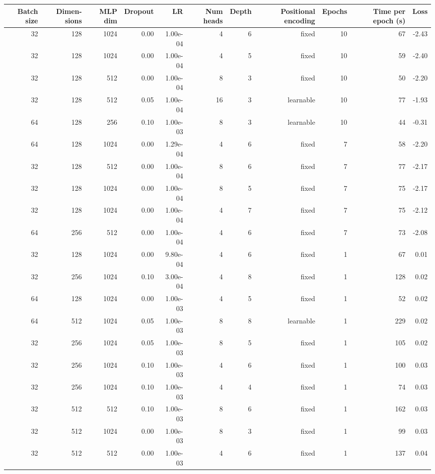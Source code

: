 \begin{appendices}
\begin{table}
\begin{tabular}{rrrrrrrrrrr}
\multicolumn{1}{p{0.5cm}}{\raggedleft Batch size} & 
\multicolumn{1}{p{1.0cm}}{\raggedleft Dimen-sions} & 
\multicolumn{1}{p{0.5cm}}{\raggedleft MLP dim} & 
\multicolumn{1}{p{1.0cm}}{\raggedleft Dropout} & 
\multicolumn{1}{p{0.5cm}}{\raggedleft LR} & 
\multicolumn{1}{p{0.5cm}}{\raggedleft Num heads} & 
\multicolumn{1}{p{0.5cm}}{\raggedleft Depth} & 
\multicolumn{1}{p{1.5cm}}{\raggedleft Positional encoding} & 
\multicolumn{1}{p{1.0cm}}{\raggedleft Epochs} &
\multicolumn{1}{p{1.5cm}}{\raggedleft Time per epoch (s)} & 
\multicolumn{1}{p{0.5cm}}{\raggedleft Loss} \\

\midrule
32 & 128 & 1024 & 0.00 & 1.00e-04 & 4 & 6 & fixed & 10 & 67 & -2.43 \\
32 & 128 & 1024 & 0.00 & 1.00e-04 & 4 & 5 & fixed & 10 & 59 & -2.40 \\
32 & 128 & 512 & 0.00 & 1.00e-04 & 8 & 3 & fixed & 10 & 50 & -2.20 \\
32 & 128 & 512 & 0.05 & 1.00e-04 & 16 & 3 & learnable & 10 & 77 & -1.93 \\
64 & 128 & 256 & 0.10 & 1.00e-03 & 8 & 3 & learnable & 10 & 44 & -0.31 \\
64 & 128 & 1024 & 0.00 & 1.29e-04 & 4 & 6 & fixed & 7 & 58 & -2.20 \\
32 & 128 & 512 & 0.00 & 1.00e-04 & 8 & 6 & fixed & 7 & 77 & -2.17 \\
32 & 128 & 1024 & 0.00 & 1.00e-04 & 8 & 5 & fixed & 7 & 75 & -2.17 \\
32 & 128 & 1024 & 0.00 & 1.00e-04 & 4 & 7 & fixed & 7 & 75 & -2.12 \\
64 & 256 & 512 & 0.00 & 1.00e-04 & 4 & 6 & fixed & 7 & 73 & -2.08 \\
\midrule
32 & 128 & 1024 & 0.00 & 9.80e-04 & 4 & 6 & fixed & 1 & 67 & 0.01 \\
32 & 256 & 1024 & 0.10 & 3.00e-04 & 4 & 8 & fixed & 1 & 128 & 0.02 \\
64 & 128 & 1024 & 0.00 & 1.00e-03 & 4 & 5 & fixed & 1 & 52 & 0.02 \\
64 & 512 & 1024 & 0.05 & 1.00e-03 & 8 & 8 & learnable & 1 & 229 & 0.02 \\
32 & 256 & 1024 & 0.05 & 1.00e-03 & 8 & 5 & fixed & 1 & 105 & 0.02 \\
32 & 256 & 1024 & 0.10 & 1.00e-03 & 4 & 6 & fixed & 1 & 100 & 0.03 \\
32 & 256 & 1024 & 0.10 & 1.00e-03 & 4 & 4 & fixed & 1 & 74 & 0.03 \\
32 & 512 & 512 & 0.10 & 1.00e-03 & 8 & 6 & fixed & 1 & 162 & 0.03 \\
32 & 512 & 1024 & 0.00 & 1.00e-03 & 8 & 3 & fixed & 1 & 99 & 0.03 \\
32 & 512 & 512 & 0.00 & 1.00e-03 & 4 & 6 & fixed & 1 & 137 & 0.04 \\
\bottomrule
\end{tabular}
\end{table}


\end{appendices}
